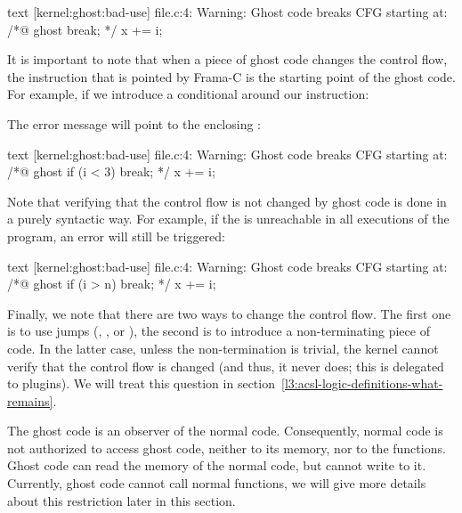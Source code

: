 \begin{CodeBlock}{text}
[kernel:ghost:bad-use] file.c:4: Warning:
  Ghost code breaks CFG starting at:
  /*@ ghost break; */
  x += i;
\end{CodeBlock}


It is important to note that when a piece of ghost code changes the control
flow, the instruction that is pointed by Frama-C is the starting
point of the ghost code. For example, if we introduce a conditional
around our  instruction:




The error message will point to the enclosing :


\begin{CodeBlock}{text}
[kernel:ghost:bad-use] file.c:4: Warning:
  Ghost code breaks CFG starting at:
  /*@ ghost if (i < 3) break; */
  x += i;
\end{CodeBlock}


Note that verifying that the control flow is not changed by ghost
code is done in a purely syntactic way. For example, if the
 is unreachable in all executions of the program,
an error will still be triggered:




\begin{CodeBlock}{text}
[kernel:ghost:bad-use] file.c:4: Warning:
  Ghost code breaks CFG starting at:
  /*@ ghost if (i > n) break; */
  x += i;
\end{CodeBlock}


Finally, we note that there are two ways to change the control
flow. The first one is to use jumps (,
, or ), the second is to
introduce a non-terminating piece of code. In the latter case, unless the non-termination
is trivial, the kernel cannot verify that the control
flow is changed (and thus, it never does; this is delegated to plugins).
We will treat this question in
section~\ref{l3:acsl-logic-definitions-what-remains}.




The ghost code is an observer of the normal code. Consequently, normal
code is not authorized to access ghost code, neither to its memory,
nor to the functions. Ghost code can read the memory of the normal code,
but cannot write to it. Currently, ghost code cannot call normal functions,
we will give more details about this restriction later in this section.


